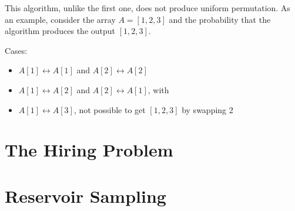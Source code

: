 This algorithm, unlike the first one, does not produce uniform permutation. As an example, consider the array $A = [1,2,3]$ and the probability that the algorithm produces the output $[1,2,3]$.

Cases:
\begin{itemize}
    \item $A[1] \leftrightarrow A[1]$ and $A[2] \leftrightarrow A[2]$
    \item $A[1] \leftrightarrow A[2]$ and $A[2] \leftrightarrow A[1]$, with 
    \item $A[1] \leftrightarrow A[3]$, not possible to get $[1,2,3]$ by swapping 2
\end{itemize}

\section{The Hiring Problem}

\section{Reservoir Sampling}